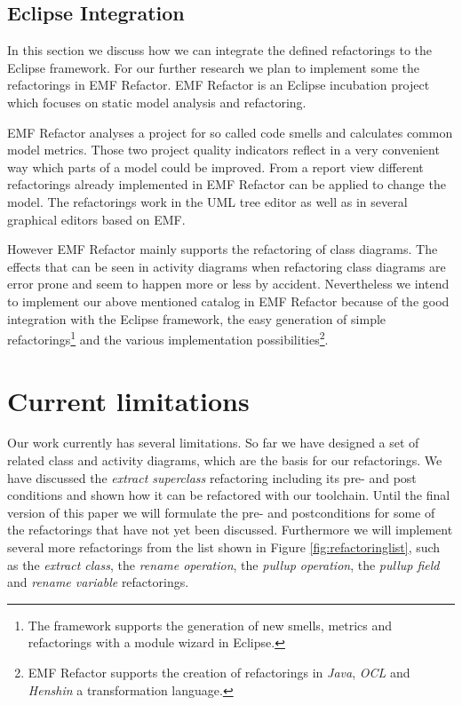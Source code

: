 \documentclass{llncs}
\begin{document}
\subsection{Eclipse Integration}
\label{sec:guiintegration}
In this section we discuss how we can integrate the defined refactorings to the Eclipse framework. For our further 
research we plan to implement some the refactorings in EMF Refactor. EMF Refactor is an Eclipse incubation project 
which focuses on static model analysis and refactoring.

EMF Refactor analyses a project for so called code smells and calculates common model metrics. Those two project quality 
indicators reflect in a very convenient way which parts of a model could be improved. From a report view different 
refactorings already implemented in EMF Refactor can be applied to change the model. The refactorings work in the UML tree 
editor as well as in several graphical editors based on EMF.

However EMF Refactor mainly supports the refactoring of class diagrams. The effects that can be seen in activity diagrams 
when refactoring class diagrams are error prone and seem to happen more or less by accident. Nevertheless we intend to 
implement our above mentioned catalog in EMF Refactor because of the good integration with the Eclipse framework, the 
easy generation of simple refactorings\footnote{The framework supports the generation of new smells, metrics and 
refactorings with a module wizard in Eclipse.} and the various implementation possibilities\footnote{EMF Refactor 
supports the creation of refactorings in \textit{Java}, \textit{OCL} and \textit{Henshin} a transformation language.}.

\section{Current limitations}
\label{sec:limitations}
Our work currently has several limitations. So far we have designed a set of related class and activity diagrams,
which are the basis for our refactorings. We have discussed the \textit{extract superclass} refactoring including its
pre- and post conditions and shown how it can be refactored with our toolchain. Until the final version of this
paper we will formulate the pre- and postconditions for some of the refactorings that have not yet been discussed.
Furthermore we will implement several more refactorings from the list shown in Figure \ref{fig:refactoringlist}, such as the
\textit{extract class}, the \textit{rename operation}, the \textit{pullup operation}, the \textit{pullup field} and 
\textit{rename variable} refactorings.
\end{document}
